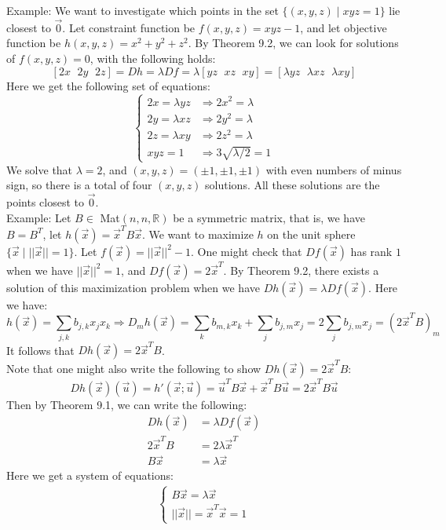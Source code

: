\documentclass[15pt]{book}
\theoremstyle{break}
\theoremstyle{break}
\newcommand{\R}{\mathbb{R}}
\newcommand{\example}{\color{green}Example: \color{black}}
\begin{document}
\example We want to investigate which points in the set $\{(x,y,z) \mid xyz=1\}$ lie closest to $\vec{0}$. Let constraint function be $f(x,y,z) = xyz-1$, and let objective function be $h(x,y,z) = x^2+y^2+z^2$. By Theorem 9.2, we can look for solutions of $f(x,y,z)=0$, with the following holds: 
$$[2x\ \ \, 2y \ \ \, 2z]=Dh = \lambda Df = \lambda[yz\ \ \, xz\ \ \, xy] = [\lambda yz \ \ \, \lambda xz \ \ \, \lambda xy]$$
Here we get the following set of equations:
$$\begin{cases}2x=\lambda yz &\Rightarrow 2x^2 = \lambda\\ 2y=\lambda xz &\Rightarrow 2y^2 = \lambda\\ 2z = \lambda xy &\Rightarrow 2z^2 = \lambda \\ xyz = 1 &\Rightarrow 3\sqrt{\lambda/2}=1  \end{cases}$$
We solve that $\lambda = 2$, and $(x,y,z) = (\pm 1, \pm 1, \pm 1)$ with even numbers of minus sign, so there is a total of four $(x,y,z)$ solutions. All these solutions are the points closest to $\vec{0}$.\\

\example
Let $B\in $ Mat$(n,n,\R)$ be a symmetric matrix, that is, we have $B = B^T$, let $h(\vec{x}) = \vec{x}^T B \vec{x}$. We want to maximize $h$ on the unit sphere $\{\vec{x}\mid ||\vec{x}|| = 1\}$. Let $f(\vec{x}) = ||\vec{x}||^2 - 1$. One might check that $Df(\vec{x})$ has rank $1$ when we have $||\vec{x}||^2 = 1$, and $Df(\vec{x}) = 2\vec{x}^T$. By Theorem 9.2, there exists a solution of this maximization problem when we have $Dh(\vec{x}) = \lambda Df(\vec{x})$. Here we have: 
$$h(\vec{x}) = \sum_{j,k} b_{j,k}x_{j}x_{k} \Rightarrow D_mh(\vec{x}) = \sum_{k} b_{m,k}x_k + \sum_{j} b_{j,m} x_j = 2\sum_{j} b_{j,m}x_j=(2\vec{x}^TB)_m$$ 
It follows that $Dh(\vec{x}) = 2\vec{x}^TB$. \\
Note that one might also write the following to show $Dh(\vec{x}) = 2\vec{x}^TB$:\\
$$Dh(\vec{x}) (\vec{u}) = h'(\vec{x};\vec{u}) = \vec{u}^TB\vec{x}+ \vec{x}^TB\vec{u} = 2\vec{x}^TB\vec{u}$$
Then by Theorem 9.1, we can write the following:
\begin{align*}
Dh(\vec{x}) &= \lambda Df(\vec{x})\\
2\vec{x}^TB &= 2\lambda \vec{x}^T\\
B\vec{x} &= \lambda \vec{x}
\end{align*}
Here we get a system of equations:
\begin{align*}
\begin{cases}B\vec{x} = \lambda\vec{x} \\  ||\vec{x}|| = \vec{x}^T\vec{x}=1  \end{cases} \tag{S1}
\end{align*}
\end{document}
